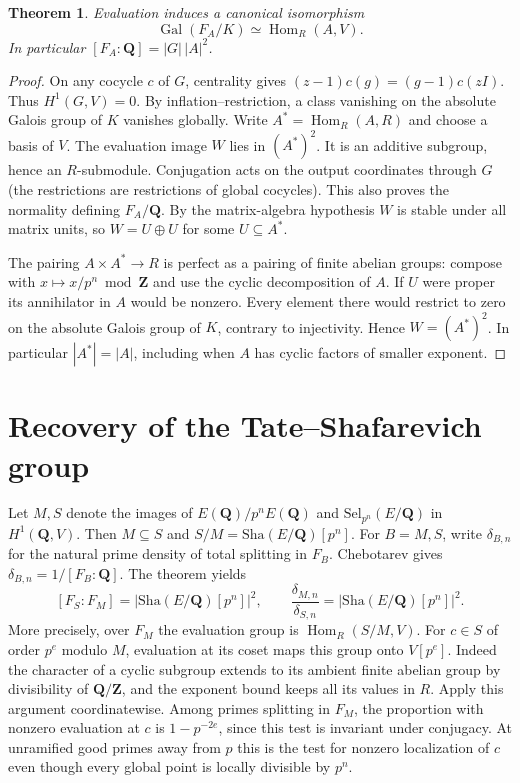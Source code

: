 \documentclass[11pt]{article}
\newcommand{\Q}{\mathbf Q}
\newcommand{\Z}{\mathbf Z}
\newcommand{\Sha}{\mathrm{Sha}}
\newcommand{\Sel}{\mathrm{Sel}}
\newtheorem{theorem}{Theorem}
\begin{document}
\begin{theorem}
Evaluation induces a canonical isomorphism
\[
 \operatorname{Gal}(F_A/K)\simeq\operatorname{Hom}_R(A,V).
\]
In particular $[F_A:\Q]=|G|\,|A|^2$.
\end{theorem}
\begin{proof}
On any cocycle $c$ of $G$, centrality gives
$(z-1)c(g)=(g-1)c(zI)$. Thus $H^1(G,V)=0$. By inflation--restriction,
a class vanishing on the absolute Galois group of $K$ vanishes globally.
Write $A^*=\operatorname{Hom}_R(A,R)$ and choose a basis of $V$.
The evaluation image $W$ lies in $(A^*)^2$. It is an additive subgroup,
hence an $R$-submodule. Conjugation acts on the output coordinates
through $G$ (the restrictions are restrictions of global cocycles).
This also proves the normality defining $F_A/\Q$. By the matrix-algebra
hypothesis $W$ is stable under all matrix units, so $W=U\oplus U$ for
some $U\subseteq A^*$.

The pairing $A\times A^*\to R$ is perfect as a pairing of finite
abelian groups: compose with $x\mapsto x/p^n\bmod\Z$ and use the
cyclic decomposition of $A$. If $U$ were proper its annihilator
in $A$ would be nonzero. Every element there would restrict to zero
on the absolute Galois group of $K$, contrary to injectivity.
Hence $W=(A^*)^2$. In particular $|A^*|=|A|$, including when $A$
has cyclic factors of smaller exponent.
\end{proof}

\section{Recovery of the Tate--Shafarevich group}
Let $M,S$ denote the images of $E(\Q)/p^nE(\Q)$ and
$\Sel_{p^n}(E/\Q)$ in $H^1(\Q,V)$. Then $M\subseteq S$ and
$S/M=\Sha(E/\Q)[p^n]$. For $B=M,S$, write $\delta_{B,n}$ for the
natural prime density of total splitting in $F_B$. Chebotarev gives
$\delta_{B,n}=1/[F_B:\Q]$. The theorem yields
\[
 [F_S:F_M]=|\Sha(E/\Q)[p^n]|^2,\qquad
 \frac{\delta_{M,n}}{\delta_{S,n}}=|\Sha(E/\Q)[p^n]|^2 .
\]
More precisely, over $F_M$ the evaluation group is
$\operatorname{Hom}_R(S/M,V)$. For $c\in S$ of order $p^e$ modulo
$M$, evaluation at its coset maps this group onto $V[p^e]$.
Indeed the character of a cyclic subgroup extends to its ambient finite
abelian group by divisibility of $\Q/\Z$, and the exponent bound keeps
all its values in $R$. Apply this argument coordinatewise. Among
primes splitting in $F_M$, the proportion with nonzero evaluation
at $c$ is $1-p^{-2e}$, since this test is invariant under conjugacy.
At unramified good primes away from $p$ this is the test for nonzero
localization of $c$ even though every global point is locally divisible
by $p^n$.
\end{document}
